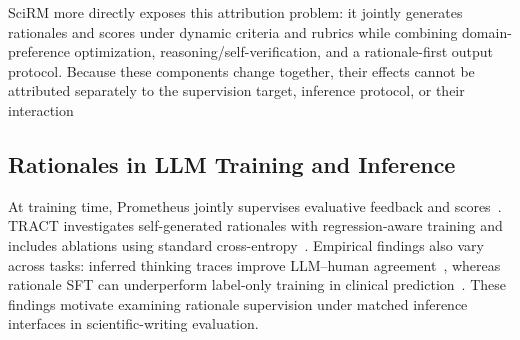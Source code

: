 SciRM more directly exposes this attribution problem: it jointly generates
rationales and scores under dynamic criteria and rubrics while combining
domain-preference optimization, reasoning/self-verification, and a
rationale-first output protocol. Because these components change together,
their effects cannot be attributed separately to the supervision target,
inference protocol, or their interaction~\citep{sahinuc-etal-2026-reward}

\subsection{Rationales in LLM Training and Inference}


At training time, Prometheus jointly supervises evaluative feedback and
scores~\citep{kim-etal-2024-prometheus-iclr}. TRACT investigates
self-generated rationales with regression-aware training and includes
ablations using standard cross-entropy~\citep{chiang-etal-2025-tract}.
Empirical findings also vary across tasks: inferred thinking traces improve
LLM--human agreement~\citep{zhang-etal-2025-judge-eyes}, whereas rationale
SFT can underperform label-only training in clinical
prediction~\citep{su-etal-2026-rationale-disease}. These findings motivate examining
rationale supervision under matched inference interfaces in scientific-writing
evaluation.


